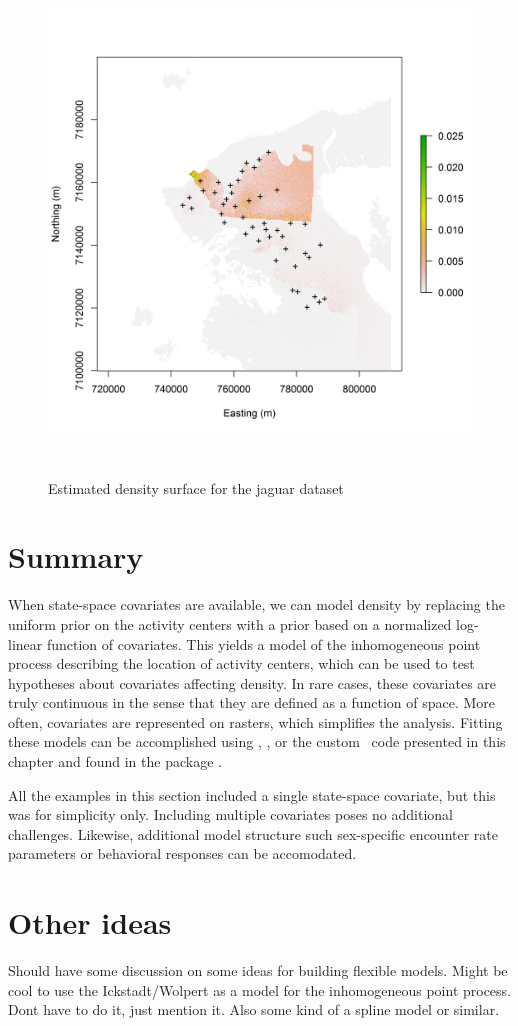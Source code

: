 \begin{figure}
\centering
\includegraphics[width=5in,height=5in]{figs/Dsurface34}
\label{ch9:fig:Dsurface}
\caption{Estimated density surface for the jaguar dataset}
\end{figure}




\section{Summary}

When state-space covariates are available, we can model
density by replacing the uniform prior on the activity centers with a
prior based on a normalized log-linear function of covariates. This
yields a model of the inhomogeneous point process describing the
location of activity centers, which can be used to test hypotheses
about covariates affecting density. In
rare cases, these covariates are truly continuous in the sense that
they are defined as a function of space. More often, covariates are
represented on rasters, which simplifies the analysis. Fitting these
models can be accomplished using \bugs, \secr, or the custom \R~code
presented in this chapter and found in the package \scrbook.

All the examples in this section included a single state-space
covariate, but this was for simplicity only. Including multiple
covariates poses no additional challenges. Likewise, additional model
structure such sex-specific encounter rate parameters or behavioral
responses can be accomodated.









\section{Other ideas}

Should have some discussion on some ideas for building flexible
models. Might be cool to use the Ickstadt/Wolpert as a model for the
inhomogeneous point process. Dont have to do it, just mention it. Also
some kind of a spline model or similar.
